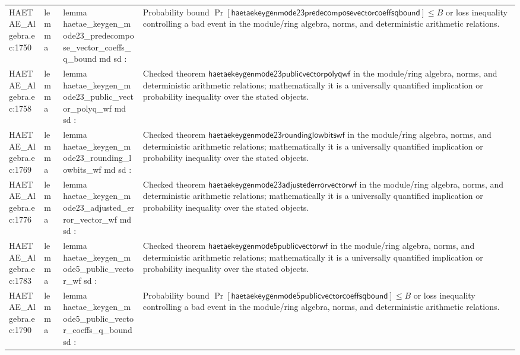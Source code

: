 \documentclass[10pt]{article}
\begin{document}
\begin{longtable}{L{0.11\textwidth}L{0.055\textwidth}L{0.385\textwidth}L{0.41\textwidth}}
HAETAE\_\allowbreak{}Algebra.\allowbreak{}ec:\allowbreak{}1750 & lemma & {\ttfamily\scriptsize lemma haetae\_\allowbreak{}keygen\_\allowbreak{}mode23\_\allowbreak{}predecompose\_\allowbreak{}vector\_\allowbreak{}coeffs\_\allowbreak{}q\_\allowbreak{}bound md sd :} & Probability bound $\Pr[\mathsf{haetaekeygenmode23predecomposevectorcoeffsqbound}]\le B$ or loss inequality controlling a bad event in the module/ring algebra, norms, and deterministic arithmetic relations. \\
HAETAE\_\allowbreak{}Algebra.\allowbreak{}ec:\allowbreak{}1758 & lemma & {\ttfamily\scriptsize lemma haetae\_\allowbreak{}keygen\_\allowbreak{}mode23\_\allowbreak{}public\_\allowbreak{}vector\_\allowbreak{}polyq\_\allowbreak{}wf md sd :} & Checked theorem $\mathsf{haetaekeygenmode23publicvectorpolyqwf}$ in the module/ring algebra, norms, and deterministic arithmetic relations; mathematically it is a universally quantified implication or probability inequality over the stated objects. \\
HAETAE\_\allowbreak{}Algebra.\allowbreak{}ec:\allowbreak{}1769 & lemma & {\ttfamily\scriptsize lemma haetae\_\allowbreak{}keygen\_\allowbreak{}mode23\_\allowbreak{}rounding\_\allowbreak{}lowbits\_\allowbreak{}wf md sd :} & Checked theorem $\mathsf{haetaekeygenmode23roundinglowbitswf}$ in the module/ring algebra, norms, and deterministic arithmetic relations; mathematically it is a universally quantified implication or probability inequality over the stated objects. \\
HAETAE\_\allowbreak{}Algebra.\allowbreak{}ec:\allowbreak{}1776 & lemma & {\ttfamily\scriptsize lemma haetae\_\allowbreak{}keygen\_\allowbreak{}mode23\_\allowbreak{}adjusted\_\allowbreak{}error\_\allowbreak{}vector\_\allowbreak{}wf md sd :} & Checked theorem $\mathsf{haetaekeygenmode23adjustederrorvectorwf}$ in the module/ring algebra, norms, and deterministic arithmetic relations; mathematically it is a universally quantified implication or probability inequality over the stated objects. \\
HAETAE\_\allowbreak{}Algebra.\allowbreak{}ec:\allowbreak{}1783 & lemma & {\ttfamily\scriptsize lemma haetae\_\allowbreak{}keygen\_\allowbreak{}mode5\_\allowbreak{}public\_\allowbreak{}vector\_\allowbreak{}wf sd :} & Checked theorem $\mathsf{haetaekeygenmode5publicvectorwf}$ in the module/ring algebra, norms, and deterministic arithmetic relations; mathematically it is a universally quantified implication or probability inequality over the stated objects. \\
HAETAE\_\allowbreak{}Algebra.\allowbreak{}ec:\allowbreak{}1790 & lemma & {\ttfamily\scriptsize lemma haetae\_\allowbreak{}keygen\_\allowbreak{}mode5\_\allowbreak{}public\_\allowbreak{}vector\_\allowbreak{}coeffs\_\allowbreak{}q\_\allowbreak{}bound sd :} & Probability bound $\Pr[\mathsf{haetaekeygenmode5publicvectorcoeffsqbound}]\le B$ or loss inequality controlling a bad event in the module/ring algebra, norms, and deterministic arithmetic relations. \\

\end{longtable}
\end{document}
